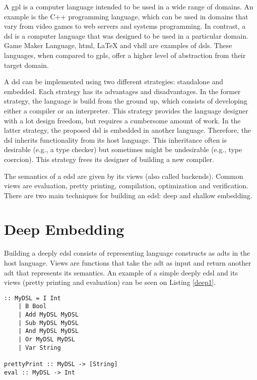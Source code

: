 A \ac{gpl} is a computer language intended to be used in a wide range of domains. An example is the C++ programming language, which can be used in domains that vary from video games to web servers and systems programming. In contrast, a \ac{dsl} is a computer language that was designed to be used in a particular domain. Game Maker Language, \acs{html}, LaTeX and \acs{vhdl} are examples of \acp{dsl}. These languages, when compared to \acp{gpl}, offer a higher level of abstraction from their target domain.

A \ac{dsl} can be implemented using two different strategies: standalone and embedded. Each strategy has its advantages and disadvantages. In the former strategy, the language is build from the ground up, which consists of developing either a compiler or an interpreter. This strategy provides the language designer with a lot design freedom, but requires a cumbersome amount of work. In the latter strategy, the proposed \ac{dsl} is embedded in another language. Therefore, the \ac{dsl} inherits functionality from its host language. This inheritance often is desirable (e.g., a type checker) but sometimes might be undesirable (e.g., type coercion). This strategy frees its designer of building a new compiler.

The semantics of a \ac{edsl} are given by its views (also called backends). Common views are evaluation, pretty printing, compilation, optimization and verification. There are two main techniques for building an \ac{edsl}: deep and shallow embedding.

\section{Deep Embedding}

Building a deeply \ac{edsl} consists of representing language constructs as \acp{adt} in the host language. Views are functions that take the \ac{adt} as input and return another \ac{adt} that represents its semantics. An example of a simple deeply \ac{edsl} and its views (pretty printing and evaluation) can be seen on Listing \ref{deep1}.


\begin{lstlisting}[caption=A simple deeply \ac{edsl} and its views,captionpos=b,label=deep1]
:: MyDSL = I Int
    | B Bool
    | Add MyDSL MyDSL
    | Sub MyDSL MyDSL
    | And MyDSL MyDSL
    | Or MyDSL MyDSL
    | Var String
    
prettyPrint :: MyDSL -> [String]
eval :: MyDSL -> Int
\end{lstlisting}

